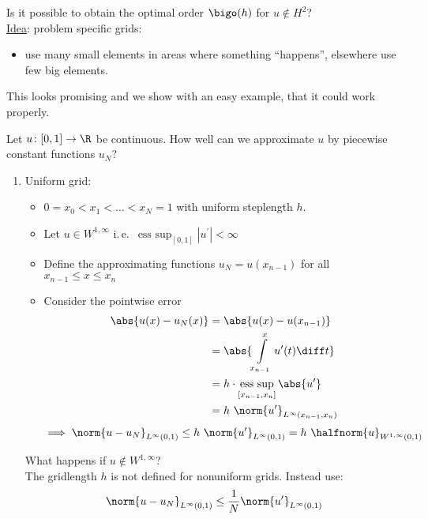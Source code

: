 Is it possible to obtain the optimal order $\bigo(h)$ for $u \not \in H^2$?\\
\underline{Idea}: problem specific grids:
\begin{itemize}
  \item use many small elements in areas where something \enquote{happens}, elsewhere use few big elements.
\end{itemize}
This looks promising and we show with an easy example, that it could work properly.
\begin{example}
	Let $u\colon [0,1] \to \R$ be continuous. How well can we approximate $u$ by piecewise constant functions $u_{N}$?
	\begin{enumerate}[label = \Roman*)]
    \item Uniform grid: \label{ex:uniformgrid}
			\begin{itemize}
				\item $0 = x_{0} < x_{1}< \dots < x_{N} = 1$ with uniform steplength $h$.
        \item Let $u \in W^{1,\infty}$ i.\,e.\ $\operatorname*{ess~sup}_{[0,1]} | u^\prime|< \infty$
				\item Define the approximating functions $u_{N}=u(x_{n-1})$ for all $x_{n-1}\leq x \leq x_{n}$
				\item Consider the pointwise error
					\begin{align*}
            \abs{u(x) - u_{N}(x)} &= \abs{u(x) - u(x_{n-1})}\\
                                  &= \abs{\int\limits_{x_{n-1}}^{x} u^\prime(t) \diff t}\\
                                  &= h\cdot \operatorname*{ess~sup}_{[x_{n-1},x_{n}]}\abs{u^\prime} \\
                                  &= h\ \norm{u^\prime}_{L^\infty(x_{n-1},x_{n})}
					\end{align*}
					\begin{equation*}
            \implies \norm{u -u_{N}}_{L^\infty(0,1)} \leq h \ \norm{u^\prime}_{L^\infty(0,1)}= h \ \halfnorm{u}_{W^{1,\infty}(0,1)}
				\end{equation*}
			\end{itemize}
			What happens if $u \not \in W^{1,\infty}$?\\
			The gridlength $h$ is not defined for nonuniform grids. Instead use:
			\begin{equation*}
        \norm{u-u_{N}}_{L^{\infty}(0,1)}  \leq \frac{1}{N} \norm{u^\prime}_{L^\infty(0,1)}
			\end{equation*}

\end{enumerate}
\end{example}
